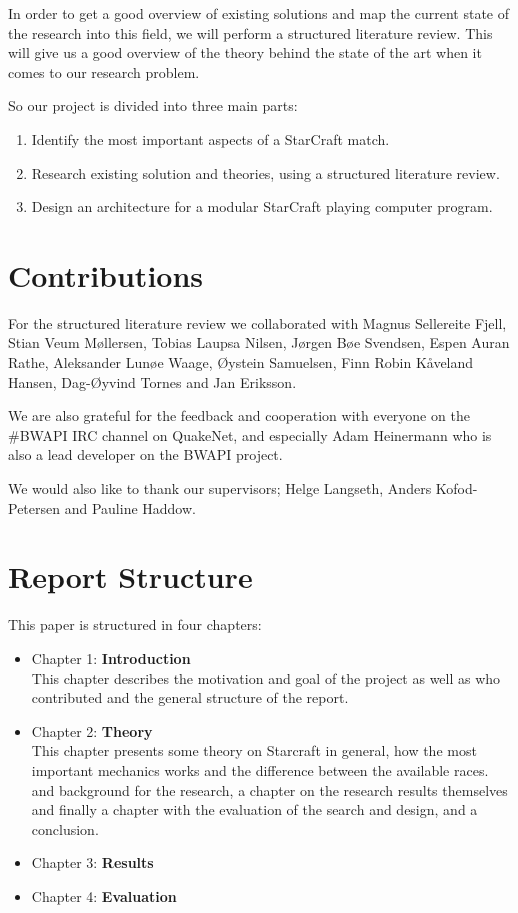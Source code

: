 In order to get a good overview of existing solutions and map the current state
of the research into this field, we will perform a structured literature review.
This will give us a good overview of the theory behind the state of the art
when it comes to our research problem.

So our project is divided into three main parts:
\begin{enumerate}
  \item Identify the most important aspects of a StarCraft match.
  \item Research existing solution and theories, using a structured literature
review.
  \item Design an architecture for a modular StarCraft playing computer program.
\end{enumerate}


\section{Contributions}
For the structured literature review we collaborated with Magnus Sellereite
Fjell, Stian Veum M{\o}llersen, Tobias Laupsa Nilsen, J{\o}rgen B{\o}e Svendsen,
Espen Auran Rathe, Aleksander Lun{\o}e Waage, {\O}ystein Samuelsen, Finn Robin
K{\aa}veland Hansen, Dag-{\O}yvind Tornes and Jan Eriksson.

We are also grateful for the feedback and cooperation with everyone on the
\#BWAPI IRC channel on QuakeNet, and especially Adam Heinermann who is also a
lead developer on the BWAPI project.

We would also like to thank our supervisors; Helge Langseth, Anders
Kofod-Petersen and Pauline Haddow.

\section{Report Structure}
This paper is structured in four chapters:
\begin{itemize}
\item Chapter 1: \textbf{Introduction} \\
This chapter describes the motivation and goal of the project as well as who contributed and the general structure of the report.
\item Chapter 2: \textbf{Theory} \\
This chapter presents some theory on Starcraft in general, how the most important mechanics works and the difference between the available races.  and background for the research, a
chapter on the research results themselves and finally a chapter with the
evaluation of the search and design, and a conclusion.
\item Chapter 3: \textbf{Results} \\

\item Chapter 4: \textbf{Evaluation} \\

\end{itemize}